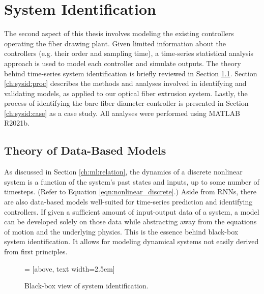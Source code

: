 \chapter{System Identification} \label{ch:sysid}

The second aspect of this thesis involves modeling the existing controllers operating the fiber drawing plant. Given limited information about the controllers (e.g. their order and sampling time), a time-series statistical analysis approach is used to model each controller and simulate outputs. The theory behind time-series system identification is briefly reviewed in Section \ref{ch:sysid:theory}. Section \ref{ch:sysid:proc} describes the methods and analyses involved in identifying and validating models, as applied to our optical fiber extrusion system. Lastly, the process of identifying the bare fiber diameter controller is presented in Section \ref{ch:sysid:case} as a case study. All analyses were performed using MATLAB R2021b. 

\section{Theory of Data-Based Models} \label{ch:sysid:theory} 

As discussed in Section \ref{ch:ml:relation}, the dynamics of a discrete nonlinear system is a function of the system's past states and inputs, up to some number of timesteps. (Refer to Equation \ref{eqn:nonlinear_discrete}.) Aside from RNNs, there are also data-based models well-suited for time-series prediction and identifying controllers. \cite{armax1, armax2} If given a sufficient amount of input-output data of a system, a model can be developed solely on those data while abstracting away from the equations of motion and the underlying physics. This is the essence behind black-box system identification. It allows for modeling dynamical systems not easily derived from first principles. 

\begin{figure}[t!]
    \begin{center}
         = [above, text width=2.5em]
        \def\edgedist{3}
    \end{center}
    \caption{Black-box view of system identification.}
    \label{fig:blackbox}
\end{figure}

